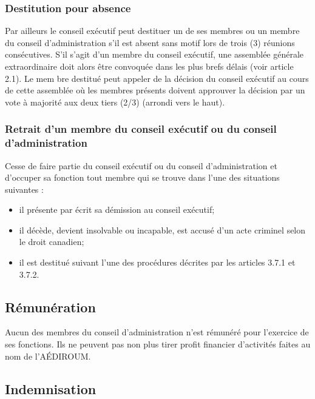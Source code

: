 \documentclass[12pt]{article}
\begin{document}
\subsubsection{Destitution pour absence}

Par ailleurs le conseil exécutif peut destituer un de ses membres ou un membre du conseil d'administration s'il est absent sans motif lors de trois (3) réunions consécutives. S'il s'agit d'un membre du conseil exécutif, une assemblée générale extraordinaire doit alors être convoquée dans les plus brefs délais (voir article 2.1). Le mem
bre destitué peut appeler de la décision du conseil exécutif au cours de cette assemblée où les membres présents doivent approuver la décision par un vote à majorité aux deux tiers (2/3) (arrondi vers le haut).

\subsubsection{Retrait d'un membre du conseil exécutif ou du conseil d'administration}

Cesse de faire partie du conseil exécutif ou du conseil d'administration et d'occuper sa fonction tout membre qui se trouve dans l'une des situations suivantes :
  \begin{itemize}
  \item il présente par écrit sa démission au conseil exécutif;
  \item il décède, devient insolvable ou incapable, est accusé d'un acte criminel selon le droit canadien;
  \item il est destitué suivant l'une des procédures décrites par les articles 3.7.1 et 3.7.2.
  \end{itemize}

\subsection{Rémunération}

Aucun des membres du conseil d'administration n'est rémunéré pour l'exercice de ses fonctions. Ils ne peuvent pas non plus tirer profit financier d'activités faites au nom de l'AÉDIROUM.

\subsection{Indemnisation}
\end{document}
